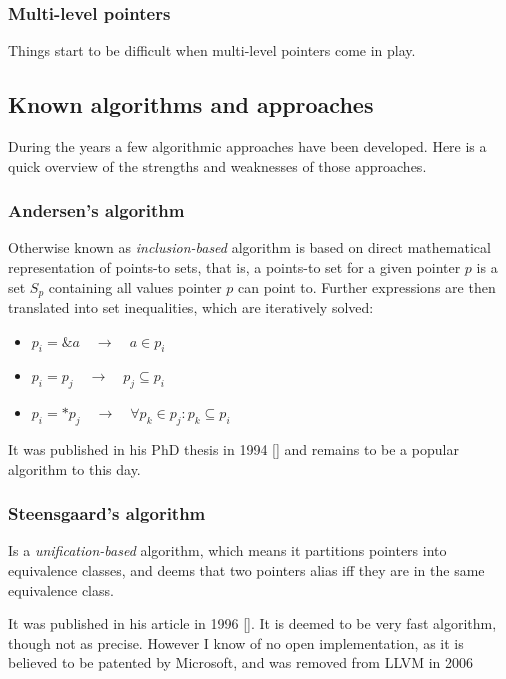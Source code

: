 \subsubsection{Multi-level pointers}

Things start to be difficult when multi-level pointers come in play. 

\subsection{Known algorithms and approaches}

During the years a few algorithmic approaches have been developed. Here is a
quick overview of the strengths and weaknesses of those approaches.

\subsubsection{Andersen's algorithm}

Otherwise known as {\it inclusion-based} algorithm is based on direct
mathematical representation of points-to sets, that is, a points-to set for a
given pointer $p$ is a set $S_p$ containing all values pointer $p$ can point to.
Further expressions are then translated into set inequalities, which are
iteratively solved:

\begin{itemize}
	\item $p_i = \&a \quad \to \quad a \in p_i$
	\item $p_i = p_j \quad \to \quad p_j \subseteq p_i$ 
	\item $p_i = *p_j \quad \to \quad \forall p_k \in p_j : p_k \subseteq p_i$
\end{itemize}

It was published in his PhD thesis in 1994 [] and remains to be a
popular algorithm to this day.


\subsubsection{Steensgaard's algorithm}

Is a {\it unification-based} algorithm, which means it partitions pointers into
equivalence classes, and deems that two pointers alias iff they are in the same
equivalence class.

It was published in his article in 1996 []. It is deemed to be very
fast algorithm, though not as precise. However I know of no open implementation,
as it is believed to be patented by Microsoft, and was removed from LLVM in 2006


